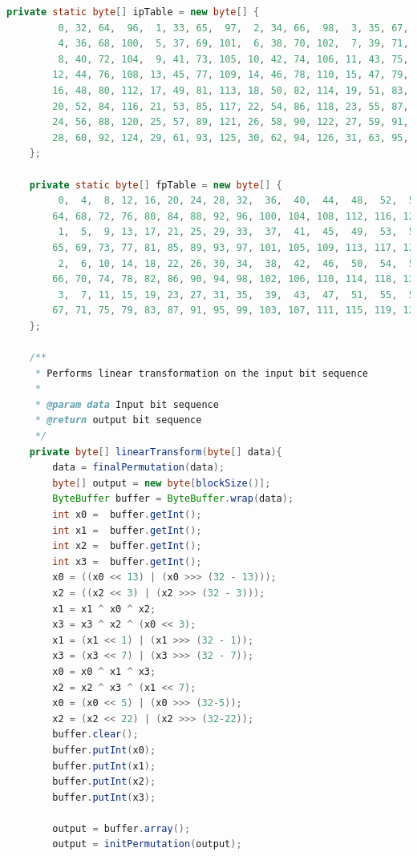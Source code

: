 \documentclass[12pt]{article} %
\begin{document}
\begin{lstlisting}[language=Java, basicstyle=\small, breaklines=true]
    private static byte[] ipTable = new byte[] {
         0, 32, 64,  96,  1, 33, 65,  97,  2, 34, 66,  98,  3, 35, 67,  99,
         4, 36, 68, 100,  5, 37, 69, 101,  6, 38, 70, 102,  7, 39, 71, 103,
         8, 40, 72, 104,  9, 41, 73, 105, 10, 42, 74, 106, 11, 43, 75, 107,
        12, 44, 76, 108, 13, 45, 77, 109, 14, 46, 78, 110, 15, 47, 79, 111,
        16, 48, 80, 112, 17, 49, 81, 113, 18, 50, 82, 114, 19, 51, 83, 115,
        20, 52, 84, 116, 21, 53, 85, 117, 22, 54, 86, 118, 23, 55, 87, 119,
        24, 56, 88, 120, 25, 57, 89, 121, 26, 58, 90, 122, 27, 59, 91, 123,
        28, 60, 92, 124, 29, 61, 93, 125, 30, 62, 94, 126, 31, 63, 95, 127
    };

    private static byte[] fpTable = new byte[] {
         0,  4,  8, 12, 16, 20, 24, 28, 32,  36,  40,  44,  48,  52,  56,  60,
        64, 68, 72, 76, 80, 84, 88, 92, 96, 100, 104, 108, 112, 116, 120, 124,
         1,  5,  9, 13, 17, 21, 25, 29, 33,  37,  41,  45,  49,  53,  57,  61,
        65, 69, 73, 77, 81, 85, 89, 93, 97, 101, 105, 109, 113, 117, 121, 125,
         2,  6, 10, 14, 18, 22, 26, 30, 34,  38,  42,  46,  50,  54,  58,  62,
        66, 70, 74, 78, 82, 86, 90, 94, 98, 102, 106, 110, 114, 118, 122, 126,
         3,  7, 11, 15, 19, 23, 27, 31, 35,  39,  43,  47,  51,  55,  59,  63,
        67, 71, 75, 79, 83, 87, 91, 95, 99, 103, 107, 111, 115, 119, 123, 127
    };
    
    /**
     * Performs linear transformation on the input bit sequence
     * 
     * @param data Input bit sequence
     * @return output bit sequence
     */
    private byte[] linearTransform(byte[] data){
        data = finalPermutation(data);
        byte[] output = new byte[blockSize()];
        ByteBuffer buffer = ByteBuffer.wrap(data);
        int x0 =  buffer.getInt();
        int x1 =  buffer.getInt();
        int x2 =  buffer.getInt();
        int x3 =  buffer.getInt();
        x0 = ((x0 << 13) | (x0 >>> (32 - 13))); 
        x2 = ((x2 << 3) | (x2 >>> (32 - 3)));
        x1 = x1 ^ x0 ^ x2;
        x3 = x3 ^ x2 ^ (x0 << 3);
        x1 = (x1 << 1) | (x1 >>> (32 - 1));
        x3 = (x3 << 7) | (x3 >>> (32 - 7));
        x0 = x0 ^ x1 ^ x3;
        x2 = x2 ^ x3 ^ (x1 << 7);
        x0 = (x0 << 5) | (x0 >>> (32-5));
        x2 = (x2 << 22) | (x2 >>> (32-22));
        buffer.clear();
        buffer.putInt(x0);
        buffer.putInt(x1);
        buffer.putInt(x2);
        buffer.putInt(x3);
        
        output = buffer.array();
        output = initPermutation(output);
        

\end{lstlisting}
\end{document}
